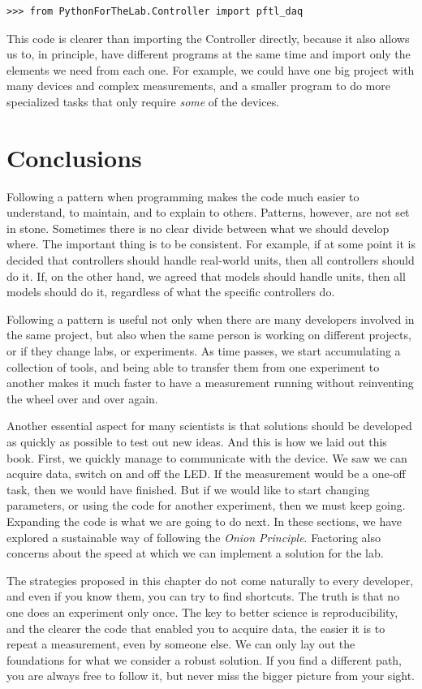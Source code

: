 \begin{verbatim}
>>> from PythonForTheLab.Controller import pftl_daq
\end{verbatim}

This code is clearer than importing the Controller directly, because it also allows us to, in principle, have different programs at the same time and import only the elements we need from each one. For example, we could have one big project with many devices and complex measurements, and a smaller program to do more specialized tasks that only require \emph{some} of the devices.

\section{Conclusions}\label{sec:layout-conclusions}
Following a pattern when programming makes the code much easier to understand, to maintain, and to explain to others. Patterns, however, are not set in stone. Sometimes there is no clear divide between what we should develop where. The important thing is to be consistent. For example, if at some point it is decided that controllers should handle real-world units, then all controllers should do it. If, on the other hand, we agreed that models should handle units, then all models should do it, regardless of what the specific controllers do.

Following a pattern is useful not only when there are many developers involved in the same project, but also when the same person is working on different projects, or if they change labs, or experiments. As time passes, we start accumulating a collection of tools, and being able to transfer them from one experiment to another makes it much faster to have a measurement running without reinventing the wheel over and over again.

Another essential aspect for many scientists is that solutions should be developed as quickly as possible to test out new ideas. And this is how we laid out this book. First, we quickly manage to communicate with the device. We saw we can acquire data, switch on and off the LED. If the measurement would be a one-off task, then we would have finished. But if we would like to start changing parameters, or using the code for another experiment, then we must keep going. Expanding the code is what we are going to do next. In these sections, we have explored a sustainable way of following the \emph{Onion Principle}. Factoring also concerns about the speed at which we can implement a solution for the lab.

The strategies proposed in this chapter do not come naturally to every developer, and even if you know them, you can try to find shortcuts. The truth is that no one does an experiment only once. The key to better science is reproducibility, and the clearer the code that enabled you to acquire data, the easier it is to repeat a measurement, even by someone else. We can only lay out the foundations for what we consider a robust solution. If you find a different path, you are always free to follow it, but never miss the bigger picture from your sight.
